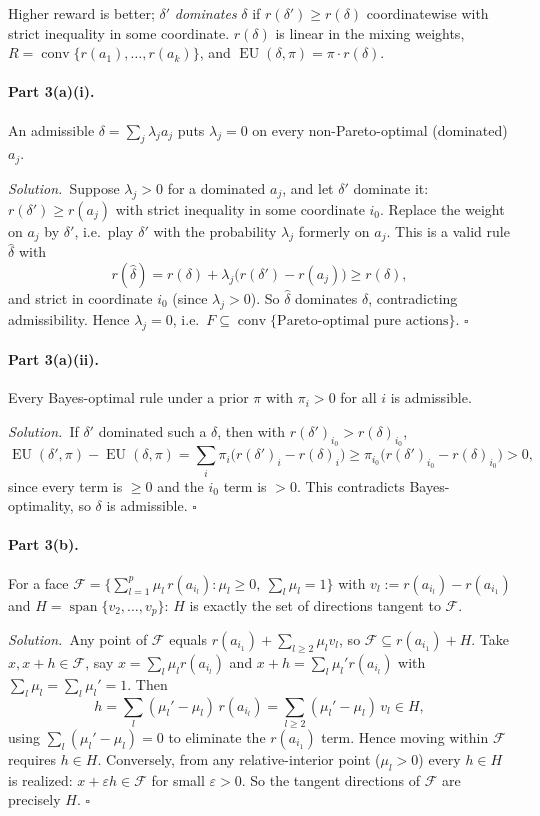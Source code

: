\documentclass[11pt]{article}
\newcommand{\rd}{r(\delta)}
\DeclareMathOperator{\EU}{EU}
\newcommand{\soln}{\medskip\noindent\textit{Solution.}\ }
\renewcommand{\qed}{\ensuremath{\square}}
\begin{document}
\begin{solution}
Higher reward is better; $\delta'$ \emph{dominates} $\delta$ if $r(\delta')\ge\rd$ coordinatewise with strict inequality in some coordinate. $\rd$ is linear in the mixing weights, $R=\operatorname{conv}\{r(a_1),\dots,r(a_k)\}$, and $\EU(\delta,\pi)=\pi\cdot\rd$.

\paragraph{Part 3(a)(i).} An admissible $\delta=\sum_j\lambda_j a_j$ puts $\lambda_j=0$ on every non-Pareto-optimal (dominated) $a_j$.

\soln Suppose $\lambda_j>0$ for a dominated $a_j$, and let $\delta'$ dominate it: $r(\delta')\ge r(a_j)$ with strict inequality in some coordinate $i_0$. Replace the weight on $a_j$ by $\delta'$, i.e.\ play $\delta'$ with the probability $\lambda_j$ formerly on $a_j$. This is a valid rule $\hat\delta$ with
\[
  r(\hat\delta)=\rd+\lambda_j\big(r(\delta')-r(a_j)\big)\ge\rd,
\]
and strict in coordinate $i_0$ (since $\lambda_j>0$). So $\hat\delta$ dominates $\delta$, contradicting admissibility. Hence $\lambda_j=0$, i.e.\ $F\subseteq\operatorname{conv}\{\text{Pareto-optimal pure actions}\}$. \qed

\paragraph{Part 3(a)(ii).} Every Bayes-optimal rule under a prior $\pi$ with $\pi_i>0$ for all $i$ is admissible.

\soln If $\delta'$ dominated such a $\delta$, then with $r(\delta')_{i_0}>\rd_{i_0}$,
\[
  \EU(\delta',\pi)-\EU(\delta,\pi)=\sum_i\pi_i\big(r(\delta')_i-\rd_i\big)\ge\pi_{i_0}\big(r(\delta')_{i_0}-\rd_{i_0}\big)>0,
\]
since every term is $\ge0$ and the $i_0$ term is $>0$. This contradicts Bayes-optimality, so $\delta$ is admissible. \qed

\paragraph{Part 3(b).} For a face $\mathcal F=\{\sum_{l=1}^p\mu_l\,r(a_{i_l}):\mu_l\ge0,\ \sum_l\mu_l=1\}$ with $v_l:=r(a_{i_l})-r(a_{i_1})$ and $H=\operatorname{span}\{v_2,\dots,v_p\}$: $H$ is exactly the set of directions tangent to $\mathcal F$.

\soln Any point of $\mathcal F$ equals $r(a_{i_1})+\sum_{l\ge2}\mu_l v_l$, so $\mathcal F\subseteq r(a_{i_1})+H$. Take $x,x+h\in\mathcal F$, say $x=\sum_l\mu_l r(a_{i_l})$ and $x+h=\sum_l\mu_l' r(a_{i_l})$ with $\sum_l\mu_l=\sum_l\mu_l'=1$. Then
\[
  h=\sum_l(\mu_l'-\mu_l)\,r(a_{i_l})=\sum_{l\ge2}(\mu_l'-\mu_l)\,v_l\in H,
\]
using $\sum_l(\mu_l'-\mu_l)=0$ to eliminate the $r(a_{i_1})$ term. Hence moving within $\mathcal F$ requires $h\in H$. Conversely, from any relative-interior point ($\mu_l>0$) every $h\in H$ is realized: $x+\varepsilon h\in\mathcal F$ for small $\varepsilon>0$. So the tangent directions of $\mathcal F$ are precisely $H$. \qed


\end{solution}
\end{document}
